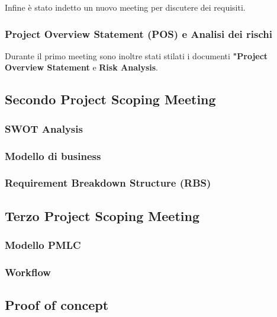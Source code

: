 Infine è stato indetto un nuovo meeting per discutere dei requisiti.

\subsubsection{Project Overview Statement (POS) e Analisi dei rischi}
Durante il primo meeting sono inoltre stati stilati i documenti \textbf{"Project Overview Statement} e \textbf{Risk Analysis}.

\subsection{Secondo Project Scoping Meeting}
\subsubsection{SWOT Analysis}
\subsubsection{Modello di business}
\subsubsection{Requirement Breakdown Structure (RBS)}

\subsection{Terzo Project Scoping Meeting}
\subsubsection{Modello PMLC}
\subsubsection{Workflow}

\subsection{Proof of concept}
